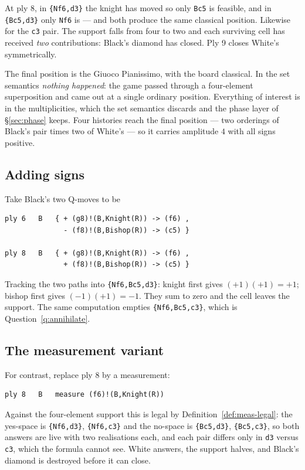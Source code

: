 \documentclass[11pt,a4paper]{article}
\theoremstyle{definition}
\theoremstyle{plain}
\begin{document}
At ply 8, in \texttt{\{Nf6,d3\}} the knight has moved so only \texttt{Bc5} is
feasible, and in \texttt{\{Bc5,d3\}} only \texttt{Nf6} is --- and both produce
the same classical position. Likewise for the \texttt{c3} pair. The support
falls from four to two and each surviving cell has received \emph{two}
contributions: Black's diamond has closed. Ply 9 closes White's symmetrically.

The final position is the Giuoco Pianissimo, with the board classical. In the
set semantics \emph{nothing happened}: the game passed through a four-element
superposition and came out at a single ordinary position. Everything of interest
is in the multiplicities, which the set semantics discards and the phase layer
of \S\ref{sec:phase} keeps. Four histories reach the final position --- two
orderings of Black's pair times two of White's --- so it carries amplitude $4$
with all signs positive.

\subsection{Adding signs}

Take Black's two Q-moves to be
\begin{lstlisting}
ply 6   B   { + (g8)!(B,Knight(R)) -> (f6) ,
              - (f8)!(B,Bishop(R)) -> (c5) }

ply 8   B   { + (g8)!(B,Knight(R)) -> (f6) ,
              + (f8)!(B,Bishop(R)) -> (c5) }
\end{lstlisting}
Tracking the two paths into \texttt{\{Nf6,Bc5,d3\}}: knight first gives
$(+1)(+1) = +1$; bishop first gives $(-1)(+1) = -1$. They sum to zero and the
cell leaves the support. The same computation empties
\texttt{\{Nf6,Bc5,c3\}}, which is Question~\ref{q:annihilate}.

\subsection{The measurement variant}

For contrast, replace ply 8 by a measurement:
\begin{lstlisting}
ply 8   B   measure (f6)!(B,Knight(R))
\end{lstlisting}
Against the four-element support this is legal by
Definition~\ref{def:meas-legal}: the yes-space is \texttt{\{Nf6,d3\}},
\texttt{\{Nf6,c3\}} and the no-space is \texttt{\{Bc5,d3\}},
\texttt{\{Bc5,c3\}}, so both answers are live with two realisations each, and
each pair differs only in \texttt{d3} versus \texttt{c3}, which the formula
cannot see. White answers, the support halves, and Black's diamond is destroyed
before it can close.
\end{document}

